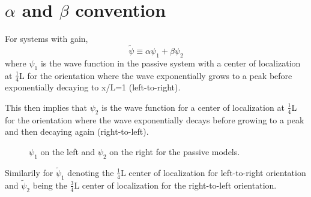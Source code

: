 \section{$\alpha$ and $\beta$ convention}

For systems with gain, 
\begin{equation}
\tilde{\psi} \equiv \alpha \psi _1 + \beta \psi _2
\end{equation}
where $\psi _1$ is the wave function in the passive system with a center of localization at $\frac{1}{4}$L for the orientation where the wave exponentially grows to a peak before exponentially decaying to x/L=1 (left-to-right).

This then implies that $\psi _2$ is the wave function for a center of localization at $\frac{1}{4}$L for the orientation where the wave exponentially decays before growing to a peak and then decaying again (right-to-left).

\begin{figure}
\vskip -0.5cm
\centerline{
}
\vskip -0.5cm
\caption{$\psi _1$ on the left and $\psi _2$ on the right for the passive models.}
\label{fig:alphabetacononicaldefectpositions}
\end{figure}

Similarily for $\tilde{ \psi} _1$ denoting the $\frac{1}{4}$L center of localization for left-to-right orientation and $\tilde{ \psi} _2$ being the $\frac{3}{4}$L center of localization for the right-to-left orientation.